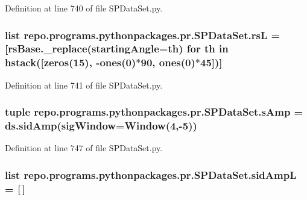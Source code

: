 Definition at line 740 of file S\-P\-Data\-Set.\-py.

\hypertarget{namespacerepo_1_1programs_1_1pythonpackages_1_1pr_1_1SPDataSet_a794711a619d88291abbe1c9c29396b5b}{
\subsubsection[{rs\-L}]{\setlength{\rightskip}{0pt plus 5cm}list repo.\-programs.\-pythonpackages.\-pr.\-S\-P\-Data\-Set.\-rs\-L = \mbox{[}rs\-Base.\-\_\-replace(starting\-Angle=th) for th in hstack(\mbox{[}zeros(15), -\/ones(0)$\ast$90, ones(0)$\ast$45\mbox{]})\mbox{]}}}\label{namespacerepo_1_1programs_1_1pythonpackages_1_1pr_1_1SPDataSet_a794711a619d88291abbe1c9c29396b5b}


Definition at line 741 of file S\-P\-Data\-Set.\-py.

\hypertarget{namespacerepo_1_1programs_1_1pythonpackages_1_1pr_1_1SPDataSet_a7ef84c87edaf55c60c75aa4a6b63fabf}{
\subsubsection[{s\-Amp}]{\setlength{\rightskip}{0pt plus 5cm}tuple repo.\-programs.\-pythonpackages.\-pr.\-S\-P\-Data\-Set.\-s\-Amp = ds.\-sid\-Amp(sig\-Window=Window(4,-\/5))}}\label{namespacerepo_1_1programs_1_1pythonpackages_1_1pr_1_1SPDataSet_a7ef84c87edaf55c60c75aa4a6b63fabf}


Definition at line 747 of file S\-P\-Data\-Set.\-py.

\hypertarget{namespacerepo_1_1programs_1_1pythonpackages_1_1pr_1_1SPDataSet_aaa1cf30f24f4635798c2ac9ab8cb991f}{
\subsubsection[{sid\-Amp\-L}]{\setlength{\rightskip}{0pt plus 5cm}list repo.\-programs.\-pythonpackages.\-pr.\-S\-P\-Data\-Set.\-sid\-Amp\-L = \mbox{[}$\,$\mbox{]}}}\label{namespacerepo_1_1programs_1_1pythonpackages_1_1pr_1_1SPDataSet_aaa1cf30f24f4635798c2ac9ab8cb991f}



